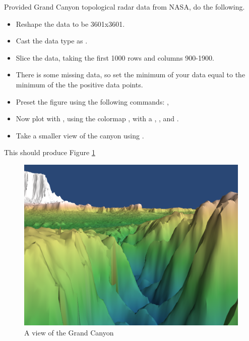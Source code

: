 \begin{problem}
Provided Grand Canyon topological radar data from NASA, do the following.

\begin{itemize}
\item Reshape the data to be 3601x3601.
\item Cast the data type as .
\item Slice the data, taking the first 1000 rows and columns 900-1900.
\item There is some missing data, so set the minimum of your data equal to the minimum of the the positive data points.
\item Preset the figure using the following commands: , 
\item Now plot with , using the colormap , with a , , and .
\item Take a smaller view of the canyon using .
\end{itemize}

This should produce Figure \ref{fig:GrandCanyon}

\end{problem}

\begin{figure}
\includegraphics[width=\textwidth]{GrandCanyon.png}
\caption{A view of the Grand Canyon}
\label{fig:GrandCanyon}
\end{figure}

